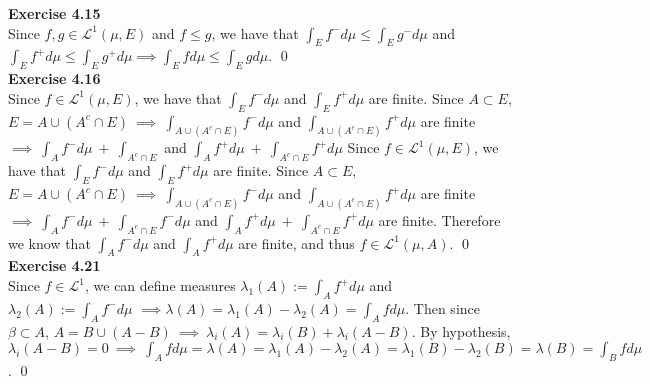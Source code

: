 \documentclass[letterpaper,12pt]{article}
\theoremstyle{definition}
\begin{document}
\textbf{Exercise 4.15} \\
Since $f, g \in \mathscr{L}^1(\mu, E)$ and $f \leq g$, we have that $\int_E f^- d\mu \leq \int_E g^- d\mu$ and $\int_E f^+ d\mu \leq \int_E g^+ d\mu \implies \int_E f d\mu \leq \int_E g d\mu$. \qed \\

\textbf{Exercise 4.16} \\
Since $f \in \mathscr{L}^1(\mu, E)$, we have that $\int_E f^- d\mu$ and $\int_E f^+ d\mu$ are finite. Since $A \subset E$, $E = A \cup (A^c \cap E) \ \implies \ \int_{A \cup (A^c \cap E)} f^- d\mu$ and $\int_{A \cup (A^c \cap E)} f^+ d\mu$ are finite $ \implies \ \int_A f^- d\mu \ + \ \int_{A^c \cap E} $ and $\int_A f^+ d\mu \ + \ \int_{A^c \cap E}f^+ d\mu$
Since $f \in \mathscr{L}^1(\mu, E)$, we have that $\int_E f^- d\mu$ and $\int_E f^+ d\mu$ are finite. Since $A \subset E$, $E = A \cup (A^c \cap E) \ \implies \ \int_{A \cup (A^c \cap E)} f^- d\mu$ and $\int_{A \cup (A^c \cap E)} f^+ d\mu$ are finite $ \implies \ \int_A f^- d\mu \ + \ \int_{A^c \cap E} f^- d\mu$ and $\int_A f^+ d\mu \ + \ \int_{A^c \cap E}f^+ d\mu$ are finite. Therefore we know that $\int_A f^- d\mu$ and $\int_A f^+ d\mu$ are finite, and thus $f \in \mathscr{L}^1(\mu, A)$. \qed \\

\textbf{Exercise 4.21} \\
Since $f \in \mathscr{L}^1$, we can define measures $\lambda_1(A) := \int_A f^+ d\mu$ and $\lambda_2(A) := \int_A f^- d\mu$ $\implies \lambda(A) = \lambda_1(A) - \lambda_2(A) = \int_A f d\mu$. Then since $\beta \subset A$, $A = B \cup (A - B) \ \implies \ \lambda_i(A) = \lambda_i(B) + \lambda_i(A - B)$. By hypothesis, $\lambda_i(A - B) = 0 \ \implies \ \int_A f d\mu = \lambda(A) = \lambda_1(A) - \lambda_2(A) = \lambda_1(B) - \lambda_2(B) = \lambda(B) = \int_B f d\mu$. \qed
\end{document}

